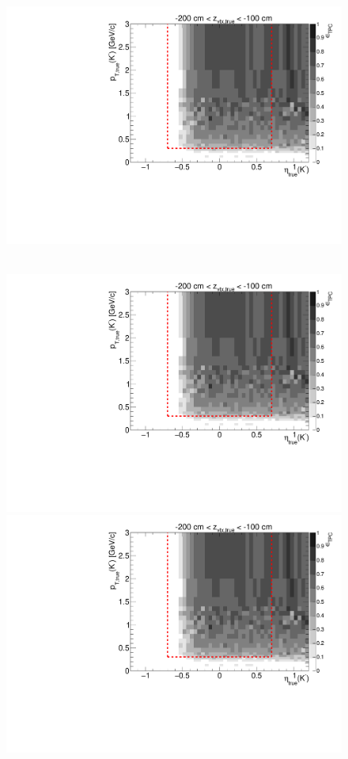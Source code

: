 \begin{figure}[hb]
{  \includegraphics[width=\linewidth,page=17]{graphics/eff/Eff2D_TPC_kaon_Minus.pdf}
}~
\parbox{0.495\textwidth}{
  \centering
  \includegraphics[width=\linewidth,page=12]{graphics/eff/Eff2D_TPC_kaon_Minus.pdf}\\
  \includegraphics[width=\linewidth,page=14]{graphics/eff/Eff2D_TPC_kaon_Minus.pdf}\\
}
\end{figure}
